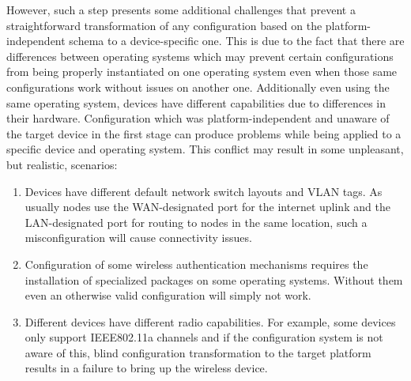 \documentclass[5p,sort&compress]{elsarticle}
\begin{document}
However, such a step presents some additional challenges that prevent a straightforward transformation of any configuration based on the platform-independent schema to a device-specific one.
This is due to the fact that there are differences between operating systems which may prevent certain configurations from being properly instantiated on one operating system even when those same configurations work without issues on another one.
Additionally even using the same operating system, devices have different capabilities due to differences in their hardware.
Configuration which was platform-independent and unaware of the target device in the first stage can produce problems while being applied to a specific device and operating system.
This conflict may result in some unpleasant, but realistic, scenarios:
\begin{enumerate}[label=\roman*)]
\item Devices have different default network switch layouts and VLAN tags.
As usually nodes use the WAN-designated port for the internet uplink and the LAN-designated port for routing to nodes in the same location, such a misconfiguration will cause connectivity issues.

\item Configuration of some wireless authentication mechanisms requires the installation of specialized packages on some operating systems.
Without them even an otherwise valid configuration will simply not work.

\item Different devices have different radio capabilities.
For example, some devices only support IEEE802.11a channels and if the configuration system is not aware of this, blind configuration transformation to the target platform results in a failure to bring up the wireless device.
\end{enumerate}
\end{document}
